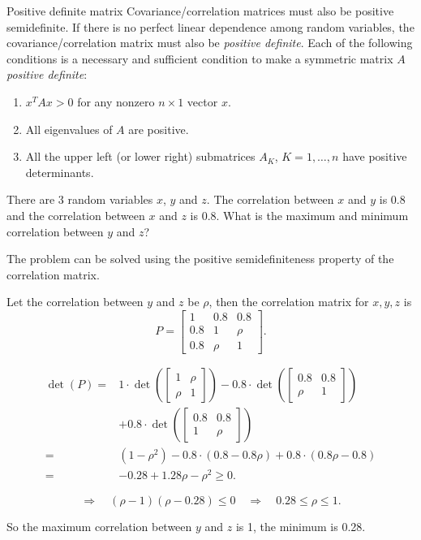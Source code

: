 \begin{concept}{Positive definite matrix}
Covariance/correlation matrices must also be positive semidefinite. If there is no perfect linear dependence among random variables, the covariance/correlation matrix must also be \emph{positive definite}. Each of the following conditions is a necessary and sufficient condition to make a symmetric matrix \(A\) \emph{positive definite}:
\begin{enumerate}
\item \(x^T A x>0\) for any nonzero \(n\times1\) vector \(x\).
\item All eigenvalues of \(A\) are positive.
\item All the upper left (or lower right) submatrices \(A_K\), \(K=1,\ldots,n\) have positive determinants.
\end{enumerate}
\end{concept}

\begin{problem}{There are 3 random variables \(x\), \(y\) and \(z\). The correlation between \(x\) and \(y\) is 0.8 and the correlation between \(x\) and \(z\) is 0.8. What is the maximum and minimum correlation between \(y\) and \(z\)?}
\end{problem}

\begin{solution}
The problem can be solved using the positive semidefiniteness property of the correlation matrix.

Let the correlation between \(y\) and \(z\) be \(\rho\), then the correlation matrix for \(x,y,z\) is
\[
P=\begin{bmatrix}1&0.8&0.8\\0.8&1&\rho\\0.8&\rho&1\end{bmatrix}.
\]

\[
\begin{aligned}
\det(P)={}&1\cdot\det\left(\begin{bmatrix}1&\rho\\\rho&1\end{bmatrix}\right)-0.8\cdot\det\left(\begin{bmatrix}0.8&0.8\\\rho&1\end{bmatrix}\right)\\
&+0.8\cdot\det\left(\begin{bmatrix}0.8&0.8\\1&\rho\end{bmatrix}\right)\\
={}&(1-\rho^2)-0.8\cdot(0.8-0.8\rho)+0.8\cdot(0.8\rho-0.8)\\
={}&-0.28+1.28\rho-\rho^2\ge0.
\end{aligned}
\]

\[
\Rightarrow\quad(\rho-1)(\rho-0.28)\le0\quad\Rightarrow\quad0.28\le\rho\le1.
\]

So the maximum correlation between \(y\) and \(z\) is 1, the minimum is 0.28.
\end{solution}

